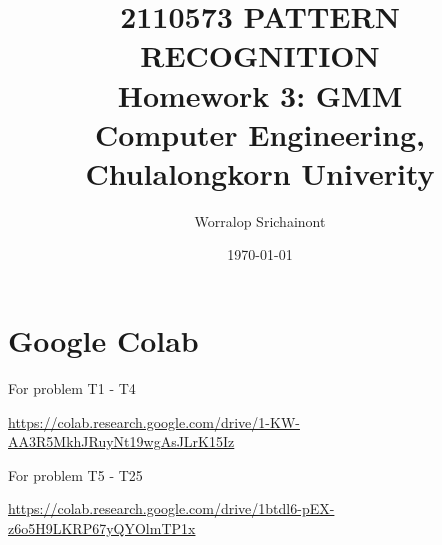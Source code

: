 \documentclass[12pt, a4paper]{article}
\title {
	\textbf{2110573 PATTERN RECOGNITION} \\
    \vspace{1em}
	\Large{\textbf{Homework 3: GMM}} \\
    \vspace{0.5em}
    \large{Computer Engineering, Chulalongkorn Univerity}
}
\author{Worralop Srichainont}
\date{\today}
\begin{document}
    \maketitle
    \thispagestyle{empty}
    \clearpage


    \section{Google Colab}
        \noindent For problem T1 - T4
        
        \noindent \url{https://colab.research.google.com/drive/1-KW-AA3R5MkhJRuyNt19wgAsJLrK15Iz}

        \vspace{1em}

        \noindent For problem T5 - T25
        
        \noindent \url{https://colab.research.google.com/drive/1btdl6-pEX-z6o5H9LKRP67yQYOlmTP1x}
\end{document}
